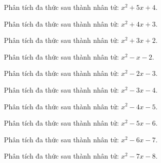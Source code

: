 \begin{bt}
	Phân tích đa thức sau thành nhân tử: $x^2 + 5 x + 4$.
\end{bt}
\begin{bt}
	Phân tích đa thức sau thành nhân tử: $x^2 + 4 x + 3$.
\end{bt}
\begin{bt}
	Phân tích đa thức sau thành nhân tử: $x^2 + 3 x + 2$.
\end{bt}
\begin{bt}
	Phân tích đa thức sau thành nhân tử: $x^2 - x - 2$.
\end{bt}
\begin{bt}
	Phân tích đa thức sau thành nhân tử: $x^2 - 2 x - 3$.
\end{bt}
\begin{bt}
	Phân tích đa thức sau thành nhân tử: $x^2 - 3 x - 4$.
\end{bt}
\begin{bt}
	Phân tích đa thức sau thành nhân tử: $x^2 - 4 x - 5$.
\end{bt}
\begin{bt}
	Phân tích đa thức sau thành nhân tử: $x^2 - 5 x - 6$.
\end{bt}
\begin{bt}
	Phân tích đa thức sau thành nhân tử: $x^2 - 6 x - 7$.
\end{bt}
\begin{bt}
	Phân tích đa thức sau thành nhân tử: $x^2 - 7 x - 8$.
\end{bt}
